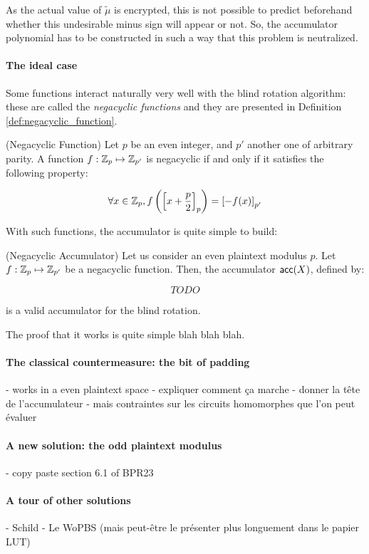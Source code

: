 As the actual value of $\tilde{\mu}$ is encrypted, this is not possible to predict beforehand whether this undesirable minus sign will appear or not. So, the accumulator polynomial has to be constructed in such a way that this problem is neutralized.


\paragraph{The ideal case}

Some functions interact naturally very well with the blind rotation algorithm: these are called the \textit{negacyclic functions} and they are presented in Definition \ref{def:negacyclic_function}.


\begin{definition} (Negacyclic Function)
	Let $p$ be an even integer, and $p'$ another one of arbitrary parity. A function $f : \mathbb{Z}_p \mapsto \mathbb{Z}_{p'}$ is negacyclic if and only if it satisfies the following property:
	
	\[
		\forall x \in \mathbb{Z}_p, f\left (\left [ x + \frac p 2 \right ]_{p} \right ) = \left [ -f(x) \right ]_{p'}
	\]
	
	\label{def:negacyclic_function}
\end{definition}

With such functions, the accumulator is quite simple to build:

\begin{definition} (Negacyclic Accumulator)
	Let us consider an even plaintext modulus $p$. Let $f:\mathbb{Z}_p \mapsto \mathbb{Z}_{p'}$ be a negacyclic function. Then, the accumulator $\textsf{acc}(X)$, defined by:
	
	\[
		TODO
	\]
	
	is a valid accumulator for the blind rotation.
\end{definition}

The proof that it works is quite simple blah blah blah.



\paragraph{The classical countermeasure: the bit of padding}

- works in a even plaintext space
- expliquer comment ça marche
- donner la tête de l'accumulateur
- mais contraintes sur les circuits homomorphes que l'on peut évaluer



\paragraph{A new solution: the odd plaintext modulus}

- copy paste section 6.1 of BPR23



\paragraph{A tour of other solutions}

- Schild
- Le WoPBS (mais peut-être le présenter plus longuement dans le papier LUT)






